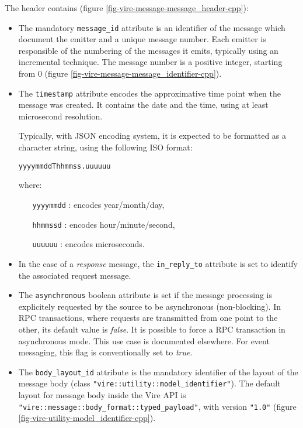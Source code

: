 The header contains (figure \ref{fig-vire-message-message_header-cpp}):
\begin{itemize}

  \item The mandatory \texttt{message\_id}  attribute is an identifier
    of the  message which  document the emitter  and a  unique message
    number.   Each emitter  is  responsible of  the  numbering of  the
    messages it  emits, typically using an  incremental technique. The
    message  number is  a positive  integer, starting  from 0  (figure
    \ref{fig-vire-message-message_identifier-cpp}).

  \item  The \texttt{timestamp}  attribute  encodes the  approximative
    time point when the message was  created. It contains the date and
    the time, using at least microsecond resolution.

    Typically,  with  JSON  encoding  system, it  is  expected  to  be
    formatted as a character string, using the following ISO format:

    \begin{center}
      \texttt{yyyymmddThhmmss.uuuuuu}
    \end{center}

    \noindent where:

    \vskip -10pt
    \begin{itemize}
    \item[\texttt{yyyymmdd} :] encodes year/month/day,
    \item[\texttt{hhmmssd} :] encodes hour/minute/second,
    \item[\texttt{uuuuuu} :] encodes microseconds.
    \end{itemize}

  \item   In   the   case    of   a   \emph{response}   message,   the
    \texttt{in\_reply\_to} attribute is set to identify the associated
    request message.

  \item  The \texttt{asynchronous}  boolean  attribute is  set if  the
    message processing  is explicitely requested  by the source  to be
    asynchronous (non-blocking).  In  RPC transactions, where requests
    are transmitted from one point to  the other, its default value is
    \emph{false}.   It  is possible  to  force  a RPC  transaction  in
    asynchronous mode.   This use  case is documented  elsewhere.  For
    event messaging, this flag is conventionally set to \emph{true}.

  \item  The  \texttt{body\_layout\_id}  attribute  is  the  mandatory
    identifier   of   the   layout   of  the   message   body   (class
    \texttt{"vire::utility::model\_identifier"}).  The  default layout
    for     message     body     inside    the     Vire     API     is
    \texttt{"vire::message::body\_format::typed\_payload"}, with version
    \texttt{"1.0"}                                             (figure
    \ref{fig-vire-utility-model_identifier-cpp}).

\end{itemize}


